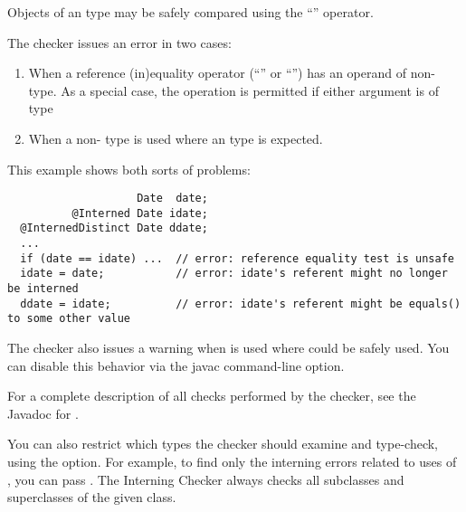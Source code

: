 Objects of an  type may be safely compared using the ``\code{==}''
operator.

The checker issues an error in two cases:

\begin{enumerate}

\item
  When a reference (in)equality operator (``\code{==}'' or ``\code{!=}'')
  has an operand of non- type.
  As a special case, the operation is permitted if either argument is of
   type

\item
  When a non- type is used
  where an  type
  is expected.

\end{enumerate}

This example shows both sorts of problems:

\begin{Verbatim}
                    Date  date;
          @Interned Date idate;
  @InternedDistinct Date ddate;
  ...
  if (date == idate) ...  // error: reference equality test is unsafe
  idate = date;           // error: idate's referent might no longer be interned
  ddate = idate;          // error: idate's referent might be equals() to some other value
\end{Verbatim}

\label{lint-dotequals}

The checker also issues a warning when  is used where
\code{==} could be safely used.  You can disable this behavior via the
javac  command-line option.

For a complete description of all checks performed by
  the checker, see the Javadoc for
  .

\label{checking-class}
You can also restrict which types the checker should examine and type-check,
using the  option.  For example, to find only the
interning errors related to uses of , you can pass
.  The Interning Checker always checks all
subclasses and superclasses of the given class.



